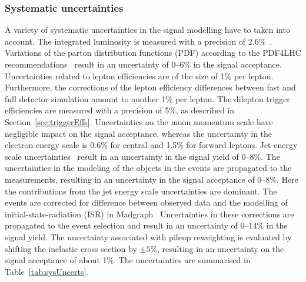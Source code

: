 \subsubsection{Systematic uncertainties}
A variety of systematic uncertainties in the signal modelling have to taken into account. The integrated luminosity is measured with a precision of 2.6\%~\cite{CMS-PAS-LUM-13-001}. Variations of the parton distribution functions (PDF) according to the PDF4LHC recommendations~\cite{Alekhin:2011sk,Botje:2011sn,Ball:2012cx,Martin:2009iq,Lai:2010vv} result in an uncertainty of 0--6\% in the signal acceptance. Uncertainties related to lepton efficiencies are of the size of 1\% per lepton. Furthermore, the corrections of the lepton efficiency differences between fast and full detector simulation amount to another 1\% per lepton. The dilepton trigger efficiencies are measured with a precision of 5\%, as described in Section~\ref{sec:triggerEffs}. Uncertainties on the muon momentum scale have negligible impact on the signal acceptance, whereas the uncertainty in the electron energy scale is 0.6\% for central and 1.5\% for forward leptons. Jet energy scale uncertainties~\cite{1748-0221-6-11-P11002} result in an uncertainty in the signal yield of 0--8\%. The uncertainties in the modeling of the objects in the events are propagated to the \MET measurements, resulting in an uncertainty in the signal acceptance of 0--8\%. Here the contributions from the jet energy scale uncertainties are dominant. The events are corrected for difference between observed data and the modelling of initial-state-radiation (ISR) in Madgraph~\cite{Chatrchyan:2013xna} Uncertainties in these corrections are propagated to the event selection and result in an uncertainty of 0--14\% in the signal yield.
The uncertainty associated with pileup reweighting is evaluated by shifting the inelastic cross section by $\pm5\%$, resulting in an uncertainty on the signal acceptance of about 1\%. The uncertainties are summarised in Table~\ref{tab:sysUncerts}.

